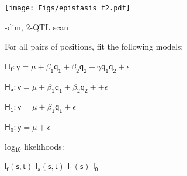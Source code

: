\documentclass[12pt]{article}
\newcommand{\headsize}{\fontsize{35}{35} \selectfont}
\newcommand{\smallsize}{\fontsize{25}{30} \selectfont}
\begin{document}
\vfill

\centerline{\texttt{[image: Figs/epistasis\_f2.pdf]}}



\newpage

\headsize \color{myyellow}
\hfill \begin{minipage}{5.75in}
-dim, 2-QTL scan 
\end{minipage}

\vspace{2cm}

\color{mywhite} \smallsize

\hfill \begin{minipage}[t]{10in}
For all pairs of positions, fit the following models:

\vspace{10mm}

\hfill
\begin{minipage}{9in}
{\color{myblue}
$\mathsf{\text{H}_f: y = \mu + \beta_1 q_1 + \beta_2 q_2 +
      \gamma q_1 q_2 + \epsilon}$

\vspace{5mm}

$\mathsf{\text{H}_a: y = \mu + \beta_1 q_1 + \beta_2 q_2 +
      + \epsilon}$

\vspace{5mm}

$\mathsf{\text{H}_1: y = \mu + \beta_1 q_1 + \epsilon}$

\vspace{5mm}

$\mathsf{\text{H}_0: y = \mu + \epsilon}$

}
\end{minipage}

\vspace{20mm}

log$_{\mathsf{10}}$ likelihoods:

\vspace{5mm}

\hfill
\begin{minipage}{9in}
{\color{myblue}

$\mathsf{l_f(s,t)}$ \hspace{2cm}
$\mathsf{l_a(s,t)}$ \hspace{2cm}
$\mathsf{l_1(s)}$ \hspace{2cm}
$\mathsf{l_0}$ \hspace{2cm}
}
\end{minipage}


\end{minipage}
\end{document}
